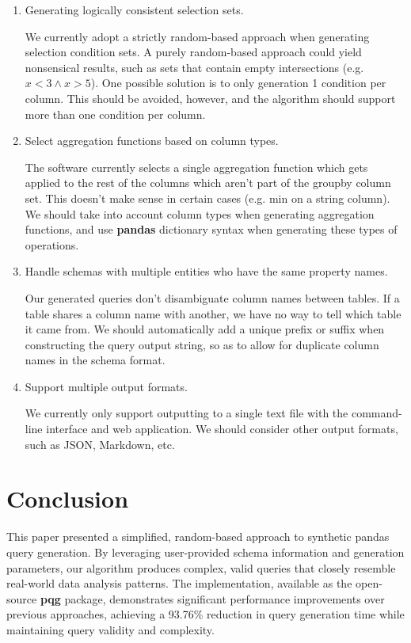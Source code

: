 \documentclass[10pt, twocolumn]{article}
\begin{document}
\begin{enumerate}
  \item Generating logically consistent selection sets.

  \spacing
  We currently adopt a strictly random-based approach when generating selection condition sets. A purely random-based approach could yield nonsensical results, such as sets that contain empty intersections (e.g. $x < 3 \land x > 5$). One possible solution is to only generation 1 condition per column. This should be avoided, however, and the algorithm should support more than one condition per column.
  \spacing

  \item Select aggregation functions based on column types.

  \spacing
  The software currently selects a single aggregation function which gets applied to the rest of the columns which aren't part of the groupby column set. This doesn't make sense in certain cases (e.g. min on a string column). We should take into account column types when generating aggregation functions, and use \textbf{pandas} dictionary syntax when generating these types of operations.
  \spacing

  \item Handle schemas with multiple entities who have the same property names.

  \spacing
  Our generated queries don't disambiguate column names between tables. If a table shares a column name with another, we have no way to tell which table it came from. We should automatically add a unique prefix or suffix when constructing the query output string, so as to allow for duplicate column names in the schema format.
  \spacing

  \item Support multiple output formats.

  \spacing
  We currently only support outputting to a single text file with the command-line interface and web application. We should consider other output formats, such as JSON, Markdown, etc.
  \spacing
\end{enumerate}

\section{Conclusion}

This paper presented a simplified, random-based approach to synthetic pandas query generation. By leveraging user-provided schema information and generation parameters, our algorithm produces complex, valid queries that closely resemble real-world data analysis patterns. The implementation, available as the open-source \textbf{pqg} package, demonstrates significant performance improvements over previous approaches, achieving a 93.76\% reduction in query generation time while maintaining query validity and complexity.
\end{document}
